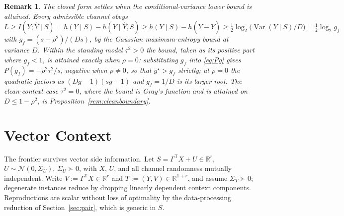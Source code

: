 \documentclass[11pt,onecolumn]{IEEEtran}
\newtheorem{remark}[theorem]{Remark}
\newcommand{\R}{\mathbb{R}}
\newcommand{\hY}{\widehat{Y}}
\begin{document}
\begin{remark}\label{rem:floor}
The closed form settles when the conditional-variance lower bound is
attained. Every admissible channel obeys
$L\ge I(Y;\hY\mid S)=h(Y\mid S)-h(Y\mid\hY,S)\ge h(Y\mid S)-h(Y-\hY)
\ge\tfrac12\log_2\bigl(\operatorname{Var}(Y\mid S)/D\bigr)
=\tfrac12\log_2 g_f$ with $g_f=(s-\rho^2)/(Ds)$, by the Gaussian
maximum-entropy bound at variance $D$. Within the standing model
$\tau^2>0$ the bound, taken as its positive part where $g_f<1$, is
attained exactly when $\rho=0$: substituting $g_f$ into \eqref{eq:Pg}
gives $P(g_f)=-\rho^2\tau^2/s$, negative when $\rho\ne0$, so that
$g^\star>g_f$ strictly; at $\rho=0$ the quadratic factors as
$(Dg-1)(sg-1)$ and $g_f=1/D$ is its larger root. The clean-context
case $\tau^2=0$, where the bound is Gray's function and is attained on
$D\le1-\rho^2$, is Proposition~\ref{rem:cleanboundary}.
\end{remark}

\section{Vector Context}
\label{sec:vector}

The frontier survives vector side information. Let
$S=\Gamma^{\mathsf T}X+U\in\R^r$, $U\sim\mathcal N(0,\Sigma_U)$,
$\Sigma_U\succ0$, with $X$, $U$, and all channel randomness mutually
independent. Write $V:=\Gamma^{\mathsf T}X\in\R^r$ and
$T:=(Y,V)\in\R^{1+r}$, and assume $\Sigma_T\succ0$; degenerate
instances reduce by dropping linearly dependent context components.
Reproductions are scalar without loss of optimality by the
data-processing reduction of Section~\ref{sec:pair}, which is generic
in $S$.
\end{document}
